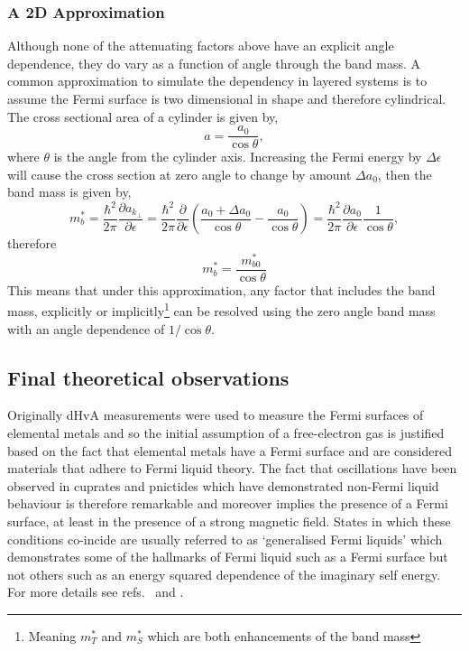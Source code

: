 \subsubsection{A 2D Approximation}

Although none of the attenuating factors above have an explicit angle dependence, they do vary as a function of angle through the band mass. A common approximation to simulate the dependency in layered systems is to assume the Fermi surface is two dimensional in shape and therefore cylindrical. The cross sectional area of a cylinder is given by,
\begin{equation}
    a = \frac{a_0}{\cos \theta},
\end{equation}
where $\theta$ is the angle from the cylinder axis. Increasing the Fermi energy by $\Delta \epsilon$ will cause the cross section at zero angle to change by amount $\Delta a_0$, then the band mass is given by,
\begin{equation}
    m^*_b = \frac{\hbar^2}{2\pi}\frac{\partial a_{k_\perp}}{\partial \epsilon} = \frac{\hbar^2}{2\pi}\frac{\partial}{\partial \epsilon}\left(\frac{a_0 + \Delta a_0 }{\cos\theta} - \frac{a_0 }{\cos\theta}\right) = \frac{\hbar^2}{2\pi}\frac{\partial a_0}{\partial \epsilon}\frac{1}{\cos \theta},
\end{equation}
therefore
\begin{equation}
    m^*_b = \frac{m^*_{b0} }{\cos{\theta}}
\end{equation}
This means that under this approximation, any factor that includes the band mass, explicitly or implicitly\footnote{Meaning $m^*_T$ and $m^*_S$ which are both enhancements of the band mass} can be resolved using the zero angle band mass with an angle dependence of $1/\cos{\theta}$.

\subsection{Final theoretical observations}

Originally \ac{dHvA} measurements were used to measure the Fermi surfaces of elemental metals and so the initial assumption of a free-electron gas is justified based on the fact that elemental metals have a Fermi surface and are considered materials that adhere to Fermi liquid theory. The fact that oscillations have been observed in cuprates and pnictides which have demonstrated non-Fermi liquid behaviour is therefore remarkable and moreover implies the presence of a Fermi surface, at least in the presence of a strong magnetic field. States in which these conditions co-incide are usually referred to as `generalised Fermi liquids' which demonstrates some of the hallmarks of Fermi liquid such as a Fermi surface but not others such as an energy squared dependence of the imaginary self energy. For more details see refs.~\cite{Wasserman1991} and \cite{Wasserman1996}.

